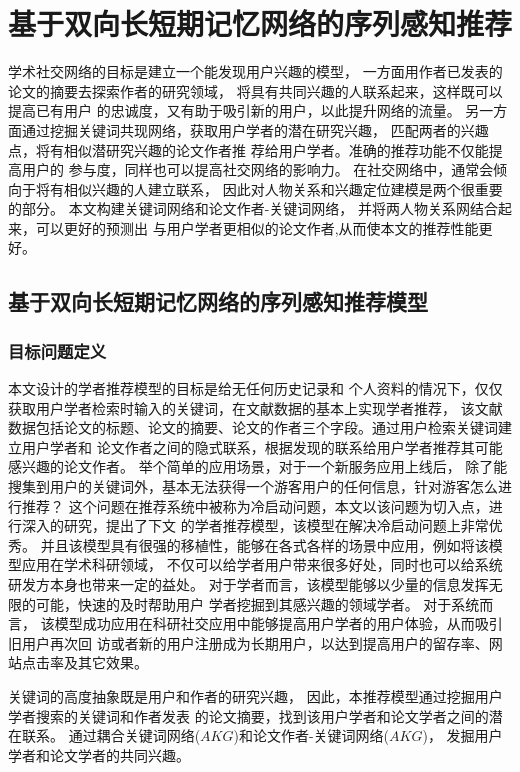﻿%
\chapter{基于双向长短期记忆网络的序列感知推荐}
学术社交网络的目标是建立一个能发现用户兴趣的模型，%
一方面用作者已发表的论文的摘要去探索作者的研究领域，%
将具有共同兴趣的人联系起来，这样既可以提高已有用户%
的忠诚度，又有助于吸引新的用户，以此提升网络的流量。%
另一方面通过挖掘关键词共现网络，获取用户学者的潜在研究兴趣，%
匹配两者的兴趣点，将有相似潜研究兴趣的论文作者推%
荐给用户学者。准确的推荐功能不仅能提高用户的%
参与度，同样也可以提高社交网络的影响力。%
在社交网络中，通常会倾向于将有相似兴趣的人建立联系，%
因此对人物关系和兴趣定位建模是两个很重要的部分。%
本文构建关键词网络和论文作者-关键词网络，%
并将两人物关系网结合起来，可以更好的预测出%
与用户学者更相似的论文作者,从而使本文的推荐性能更好。%

\section{基于双向长短期记忆网络的序列感知推荐模型}
\subsection{目标问题定义}

本文设计的学者推荐模型的目标是给无任何历史记录和%
个人资料的情况下，仅仅获取用户学者检索时输入的关键词，在文献数据的基本上实现学者推荐，%
该文献数据包括论文的标题、论文的摘要、论文的作者三个字段。通过用户检索关键词建立用户学者和%
论文作者之间的隐式联系，根据发现的联系给用户学者推荐其可能感兴趣的论文作者。%
举个简单的应用场景，对于一个新服务应用上线后，%
除了能搜集到用户的关键词外，基本无法获得一个游客用户的任何信息，针对游客怎么进行推荐？%
这个问题在推荐系统中被称为冷启动问题，本文以该问题为切入点，进行深入的研究，提出了下文%
的学者推荐模型，该模型在解决冷启动问题上非常优秀。%
并且该模型具有很强的移植性，能够在各式各样的场景中应用，例如将该模型应用在学术科研领域，%
不仅可以给学者用户带来很多好处，同时也可以给系统研发方本身也带来一定的益处。%
对于学者而言，该模型能够以少量的信息发挥无限的可能，快速的及时帮助用户%
学者挖掘到其感兴趣的领域学者。
对于系统而言，
该模型成功应用在科研社交应用中能够提高用户学者的用户体验，从而吸引旧用户再次回%
访或者新的用户注册成为长期用户，以达到提高用户的留存率、网站点击率及其它效果。

关键词的高度抽象既是用户和作者的研究兴趣，%
因此，本推荐模型通过挖掘用户学者搜索的关键词和作者发表%
的论文摘要，找到该用户学者和论文学者之间的潜在联系。%
通过耦合关键词网络($AKG$)和论文作者-关键词网络($AKG$)，%
发掘用户学者和论文学者的共同兴趣。%

